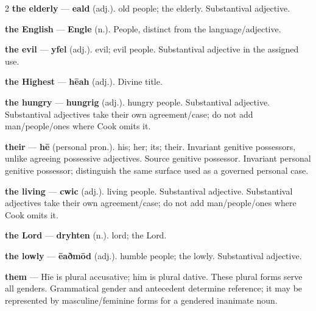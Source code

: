 \begin{multicols}{2}
\textbf{the elderly} — \textbf{eald} (adj.). old people; the elderly. Substantival adjective.\par
\textbf{the English} — \textbf{Engle} (n.). People, distinct from the language/adjective.\par
\textbf{the evil} — \textbf{yfel} (adj.). evil; evil people. Substantival adjective in the assigned use.\par
\textbf{the Highest} — \textbf{hēah} (adj.). Divine title.\par
\textbf{the hungry} — \textbf{hungrig} (adj.). hungry people. Substantival adjective. Substantival adjectives take their own agreement/case; do not add man/people/ones where Cook omits it.\par
\textbf{their} — \textbf{hē} (personal pron.). his; her; its; their. Invariant genitive possessors, unlike agreeing possessive adjectives. Source genitive possessor. Invariant personal genitive possessor; distinguish the same surface used as a governed personal case.\par
\textbf{the living} — \textbf{cwic} (adj.). living people. Substantival adjective. Substantival adjectives take their own agreement/case; do not add man/people/ones where Cook omits it.\par
\textbf{the Lord} — \textbf{dryhten} (n.). lord; the Lord.\par
\textbf{the lowly} — \textbf{ēaðmōd} (adj.). humble people; the lowly. Substantival adjective.\par
\textbf{them} — Hīe is plural accusative; him is plural dative. These plural forms serve all genders. Grammatical gender and antecedent determine reference; it may be represented by masculine/feminine forms for a gendered inanimate noun.\par

\end{multicols}
